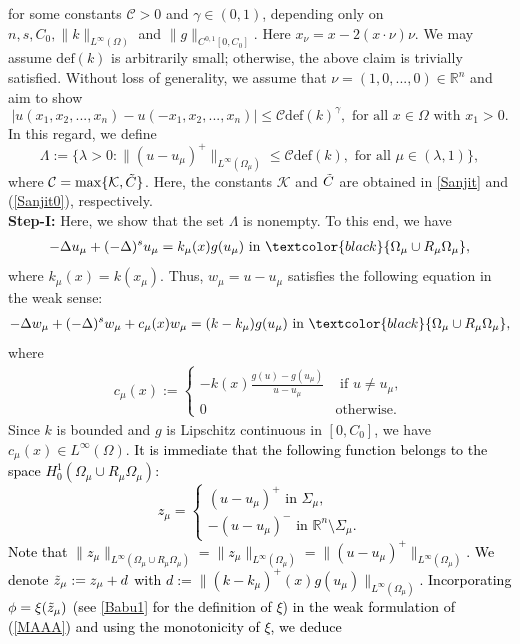 \documentclass[11pt, notitlepage]{article}
\def\R{\mathbb{R}}
\newcommand{\De} {\Delta}
\begin{document}
{for some constants $\mathscr{C}>0$ and $\gamma\in (0,1)$, depending only on $n,s,C_0,\|k\|_{L^\infty(\Omega)}$ and $ \|g\|_{C^{0,1}[0,C_0]}$. Here $x_\nu=x-2(x\cdot\nu)\nu$. We may assume $\mathrm{def}(k)$ is arbitrarily small; otherwise, the above claim is trivially satisfied. Without loss of generality, we assume that $\nu=(1,0,...,0)\in\R^n$ and aim to show
$$|u(x_1,x_2,...,x_n)-u(-x_1,x_2,...,x_n)|\leq \mathscr{C}\mathrm{def}(k)^\gamma, \text{ for all }x\in \Omega \text{ with } x_1>0.$$
In this regard, we define $$\Lambda:=\{ \lambda>0: \|(u-u_\mu)^+\|_{L^\infty(\Omega_\mu)}\leq \mathcal{C}\mathrm{def}(k),\text{ for all }\mu\in (\lambda,1)\},$$
where $\mathcal{C}=\max\{\mathcal{K},\Tilde{C}\}$. Here, the constants $\mathcal{K}$ and $\Tilde{C}$ are obtained in \textcolor{black}{\eqref{Sanjit}} and (\ref{Sanjit0}), respectively.\\
\textbf{Step-I:} Here, we show that the set $\Lambda$ is nonempty. To this end, we have 
\begin{align*}
    -\De u_\mu+(-\De)^su_\mu=k_\mu(x)g(u_\mu) \text{ in }\textcolor{black}{\Omega_\mu\cup R_\mu\Omega_\mu},
\end{align*}
where $k_\mu(x)=k(x_\mu)$. Thus, $w_\mu=u-u_\mu$ satisfies the following equation in the weak sense:
\begin{align}\label{MAAA}
     -\De w_\mu+(-\De )^sw_\mu+c_\mu(x)w_\mu=(k-k_\mu)g(u_\mu) \text{ in }\textcolor{black}{\Omega_\mu\cup R_\mu\Omega_\mu},
\end{align}
where 
\begin{align}\label{RS}
    c_\mu(x):=\begin{cases}
    -k(x)\frac{g(u)-g(u_\mu)}{u-u_\mu} &\text{ if } u\neq u_\mu,\\
    0&\text{otherwise.}  
\end{cases}
\end{align}
Since $k$ is bounded and $g$ is Lipschitz continuous in $[0,C_0]$, we have $c_\mu(x)\in L^\infty(\Omega)$. \textcolor{black}{It is immediate that the following function belongs to the space $H^1_0(\Omega_\mu\cup R_\mu\Omega_\mu)$: $$z_\mu=\begin{cases}
    (u-u_\mu)^+\mbox{ in }\Sigma_\mu,\\
    -(u-u_\mu)^-\mbox{ in }\R^n\setminus\Sigma_\mu.
\end{cases}$$
Note that $\|z_\mu\|_{L^\infty(\Omega_\mu\cup R_\mu\Omega_\mu)}=\|z_\mu\|_{L^\infty(\Omega_\mu)}=\|(u-u_\mu)^+\|_{L^\infty(\Omega_\mu)}$. We denote $\Tilde{z}_\mu:=z_\mu+d$ with $d:=\|(k-k_\mu)^+(x)g(u_\mu)\|_{L^\infty(\Omega_\mu)}$. Incorporating $\phi=\xi(\Tilde{z}_\mu)$ (see \ref{Babu1} for the definition of $\xi$) in the weak formulation of (\ref{MAAA}) and using the monotonicity of $\xi$, we deduce
}}
\end{document}
